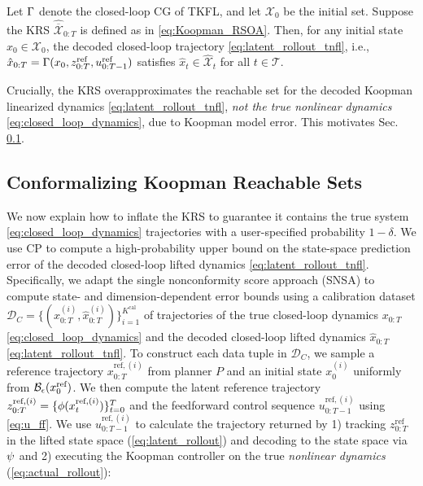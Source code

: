 \setcounter{theorem}{0}
\begin{lemma}
\label{lem:koopman_containment}
\renewcommand{\thelemma}{1}
Let $\Gamma$ denote the closed-loop CG of TKFL, and let $\mathcal{X}_0$ be the initial set. Suppose the KRS $\hat{\overline{\mathcal{X}}}_{0:T}$ is defined as in \eqref{eq:Koopman_RSOA}. Then, for any initial state $x_0 \in \mathcal{X}_0$, the decoded closed-loop trajectory \eqref{eq:latent_rollout_tnfl}, i.e.,
$\hat{x}_{0:T} = \Gamma(x_0, z^{\text{ref}}_{0:T}, u^{\text{ref}}_{0:T-1})$ satisfies $\hat{x}_t \in \hat{\mathcal{X}}_t$ for all $t \in \mathcal{T}$.
\end{lemma}

\noindent Crucially, the KRS overapproximates the reachable set for the decoded Koopman linearized dynamics \eqref{eq:latent_rollout_tnfl}, \textit{not the true nonlinear dynamics} \eqref{eq:closed_loop_dynamics}, due to Koopman model error. This motivates Sec. \ref{sec:conformalize_KRS}.

\subsection{Conformalizing Koopman Reachable Sets}
\label{sec:conformalize_KRS}
We now explain how to inflate the KRS to guarantee it contains the true system \eqref{eq:closed_loop_dynamics} trajectories with a user-specified probability $1-\delta$. We use CP to compute a high-probability upper bound on the state-space prediction error of the decoded closed-loop lifted dynamics \eqref{eq:latent_rollout_tnfl}. Specifically, we adapt the single nonconformity score approach (SNSA) \citep{cp_survey} to compute state- and dimension-dependent error bounds using a calibration dataset $\mathcal{D}_C = \{(x_{0:T}^{(i)}, \hat x_{0:T}^{(i)})\}_{i=1}^{K^\textrm{cal}}$ of trajectories of the true closed-loop dynamics $x_{0:T}$ \eqref{eq:closed_loop_dynamics} and the decoded closed-loop lifted dynamics $\hat x_{0:T}$  \eqref{eq:latent_rollout_tnfl}. To construct each data tuple in $\mathcal{D}_C$, we sample a reference trajectory $x_{0:T}^{\text{ref},(i)}$ from planner $P$ and an initial state $x_0^{(i)}$ uniformly from $\mathcal{B}_{\epsilon}(x_{0}^{\text{ref}})$. We then compute the latent reference trajectory $z_{0:T}^{\text{ref}, (i)} = \{\phi(x_{t}^{\text{ref},(i)})\}_{t=0}^T$ and the feedforward control sequence $u_{0:T-1}^{\text{ref}, (i)}$ using \eqref{eq:u_ff}. We use $u_{0:T-1}^{\text{ref}, (i)}$ to calculate the trajectory returned by 1) tracking $z_{0:T}^{\text{ref}}$ in the lifted state space (\ref{eq:latent_rollout}) and decoding to the state space via $\psi$ and 2) executing the Koopman controller on the true \textit{nonlinear dynamics} (\ref{eq:actual_rollout}):


